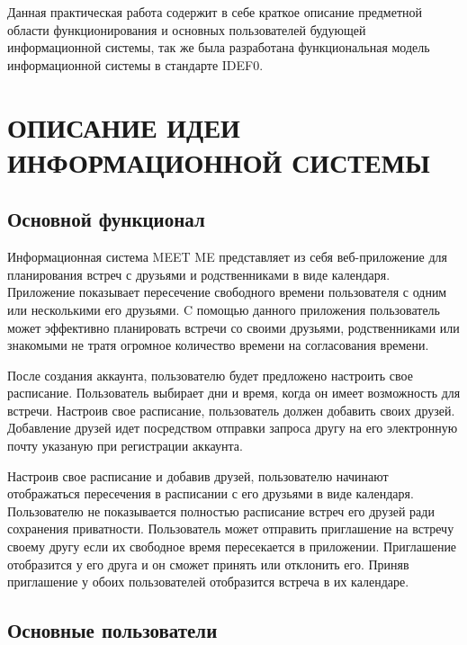\documentclass[14pt]{extreport}
\begin{document}
\pagestyle{empty} %



\pagestyle{plain} %
\tableofcontents
\intro\label{intro} 

Данная практическая работа содержит в себе краткое описание предметной области функционирования и основных пользователей будующей информационной системы, так же была разработана функциональная модель информационной системы в стандарте IDEF0.


\chapter{ОПИСАНИЕ ИДЕИ ИНФОРМАЦИОННОЙ СИСТЕМЫ \label{chapter1}}

\section{Основной функционал}

Информационная система MEET ME представляет из себя веб-приложение для планирования встреч с друзьями и родственниками в виде календаря. 
Приложение показывает пересечение свободного времени пользователя с одним или несколькими его друзьями.
C помощью данного приложения пользователь может эффективно планировать встречи со своими друзьями, родственниками или знакомыми не тратя огромное количество времени на согласования времени. 

После создания аккаунта, пользователю будет предложено настроить свое расписание. Пользователь выбирает дни и время, когда он имеет возможность для встречи. 
Настроив свое расписание, пользователь должен добавить своих друзей.  Добавление друзей идет посредством отправки запроса другу на его электронную почту указаную при регистрации аккаунта.

Настроив свое расписание и добавив друзей, пользователю начинают отображаться пересечения в расписании с его друзьями в виде календаря. Пользователю не показывается полностью расписание встреч его друзей ради сохранения приватности. Пользователь может отправить приглашение на встречу своему другу если их свободное время пересекается в приложении. Приглашение отобразится у его друга и он сможет принять или отклонить его. Приняв приглашение у обоих пользователей отобразится встреча в их календаре. 

\section{Основные пользователи}
\end{document}
